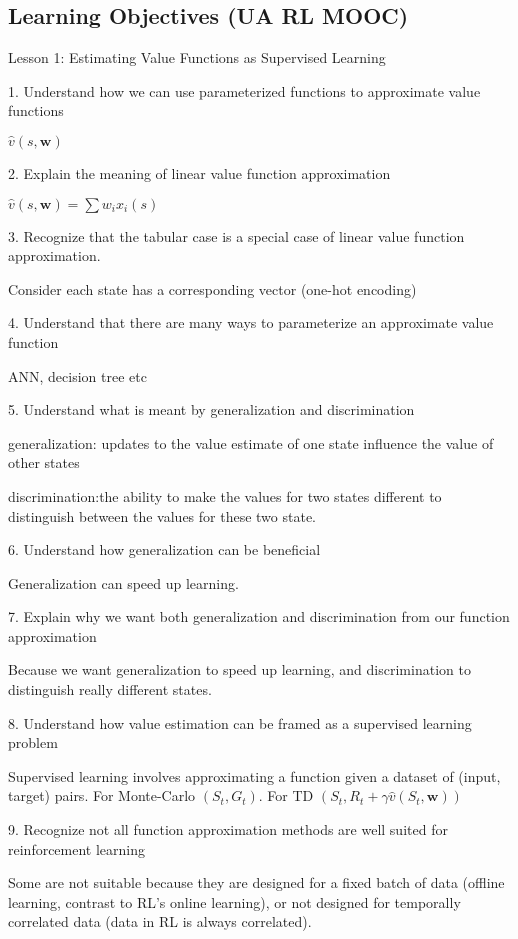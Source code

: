 \documentclass[sutton_barto_notes.tex]{subfiles}
\begin{document}
\subsection{Learning Objectives (UA RL MOOC)}

Lesson 1: Estimating Value Functions as Supervised Learning 

1. Understand how we can use parameterized functions to approximate value functions 

$\hat{v}(s, \bm{w})$

2. Explain the meaning of linear value function approximation 

$\hat{v}(s, \bm{w}) = \sum w_i x_i(s)$

3. Recognize that the tabular case is a special case of linear value function approximation. 

Consider each state has a corresponding vector (one-hot encoding)

4. Understand that there are many ways to parameterize an approximate value function 

ANN, decision tree etc

5. Understand what is meant by generalization and discrimination 

generalization: updates to the value estimate of one state influence the value of other states

discrimination:the ability to make the values for two states different to distinguish between the values for these two state.

6. Understand how generalization can be beneficial 

Generalization can speed up learning.

7. Explain why we want both generalization and discrimination from our function approximation 

Because we want generalization to speed up learning, and discrimination to distinguish really different states.

8. Understand how value estimation can be framed as a supervised learning problem 

Supervised learning involves approximating a function given a dataset of (input, target) pairs. For Monte-Carlo $(S_t, G_t)$. For TD $(S_t, R_t+\gamma\hat{v}(S_t, \bm{w}))$

9. Recognize not all function approximation methods are well suited for reinforcement learning 

Some are not suitable because they are designed for a fixed batch of data (offline learning, contrast to RL's online learning), or not designed for temporally correlated data (data in RL is always correlated).
\end{document}
